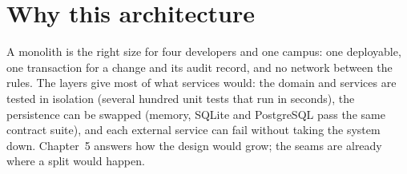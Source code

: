 \section{Why this architecture}
A monolith is the right size for four developers and one campus: one deployable, one
transaction for a change and its audit record, and no network between the rules. The layers
give most of what services would: the domain and services are tested in isolation
(several hundred unit tests that run in seconds), the persistence can be swapped (memory, SQLite and PostgreSQL pass the same contract
suite), and each external service can fail without taking the system down. Chapter~5 answers
how the design would grow; the seams are already where a split would happen.

